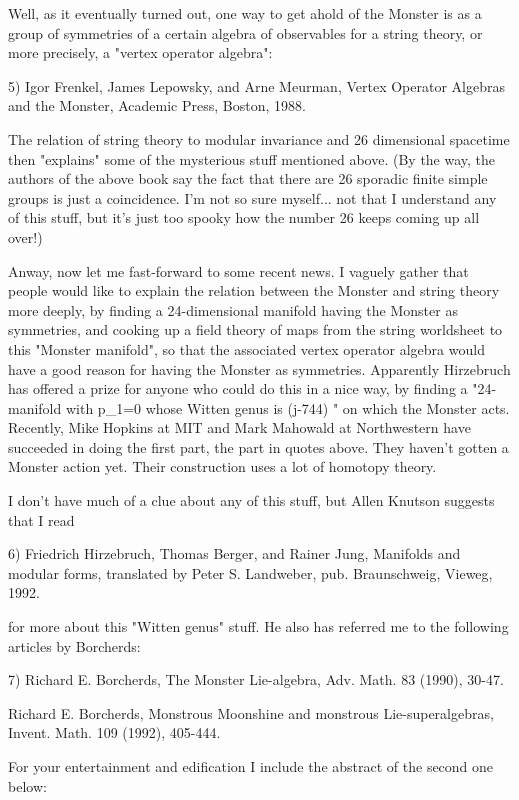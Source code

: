 Well, as it eventually turned out, one way to get ahold of the Monster
is as a group of symmetries of a certain algebra of observables for a
string theory, or more precisely, a "vertex operator algebra":

5) Igor Frenkel, James Lepowsky, and Arne Meurman, Vertex Operator
Algebras and the Monster, Academic Press, Boston, 1988. 

The relation of string theory to modular invariance and 26 dimensional
spacetime then "explains" some of the mysterious stuff mentioned above.
(By the way, the authors of the above book say the fact that there are
26 sporadic finite simple groups is just a coincidence.  I'm not so sure
myself... not that I understand any of this stuff, but it's just too
spooky how the number 26 keeps coming up all over!)  

Anway, now let me fast-forward to some recent news.  I vaguely gather
that people would like to explain the relation between the Monster and
string theory more deeply, by finding a 24-dimensional manifold having
the Monster as symmetries, and cooking up a field theory of maps from
the string worldsheet to this "Monster manifold", so that the associated
vertex operator algebra would have a good reason for having the Monster
as symmetries.  Apparently Hirzebruch has offered a prize for anyone
who could do this in a nice way, by finding a "24-manifold with p_{1}=0 
whose
Witten genus is (j-744) \Delta " on which the Monster acts.  Recently, 
Mike Hopkins at MIT and Mark Mahowald at Northwestern have succeeded in
doing the first part, the part in quotes above.  They haven't gotten a
Monster action yet.  Their construction uses a lot of homotopy theory.

I don't have much of a clue about any of this stuff, but Allen Knutson
suggests that I read

6) Friedrich Hirzebruch, Thomas Berger, and Rainer Jung, Manifolds and
modular forms, translated by Peter S. Landweber, pub. Braunschweig,
Vieweg, 1992.  

for more about this "Witten genus" stuff.  He also has referred me to 
the following articles by Borcherds:

7) Richard E. Borcherds, The Monster Lie-algebra, Adv. Math. 83 (1990),
30-47.

Richard E. Borcherds, Monstrous Moonshine and monstrous
Lie-superalgebras, Invent. Math. 109 (1992), 405-444.

For your entertainment and edification I include the abstract of the
second one below:

